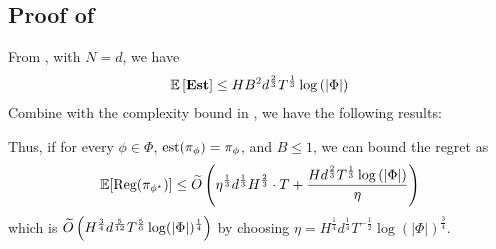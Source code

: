 


\subsection{Proof of }
From , with $N = d$, we have
\begin{align*}
    \mathbb{E}\left[\textbf{\textup{Est}}\right] \le HB^2d^{\frac{2}{3}}T^{\frac{1}{3}}\log\left(|\Phi|\right)
\end{align*}
Combine with the complexity bound in , we have the following results:

Thus, if for every $\phi \in \Phi$, $\operatorname*{est}(\pi_{\phi}) = \pi_{\phi}$, and $B \le 1$,  we can bound the regret as 
\begin{align*}
    \mathbb{E}[\text{\rm Reg}(\pi_{\phi^\star})] \leq \widetilde{O}\left(\eta^{\frac{1}{3}}d^{\frac{1}{3}}H^{\frac{2}{3}}\cdot T + \frac{ Hd^{\frac{2}{3}}T^{\frac{1}{3}}\log\left(|\Phi|\right)}{\eta}\right)
\end{align*}
which is $\widetilde{O}\left(H^{\frac{3}{4}}d^{\frac{5}{12}}T^{\frac{5}{6}}\log(|\Phi|)^{\frac{1}{4}}\right)$
by choosing $\eta = H^{\frac{1}{4}}d^{\frac{1}{4}}T^{-\frac{1}{2}}\log(|\Phi|)^{\frac{3}{4}}$. %



